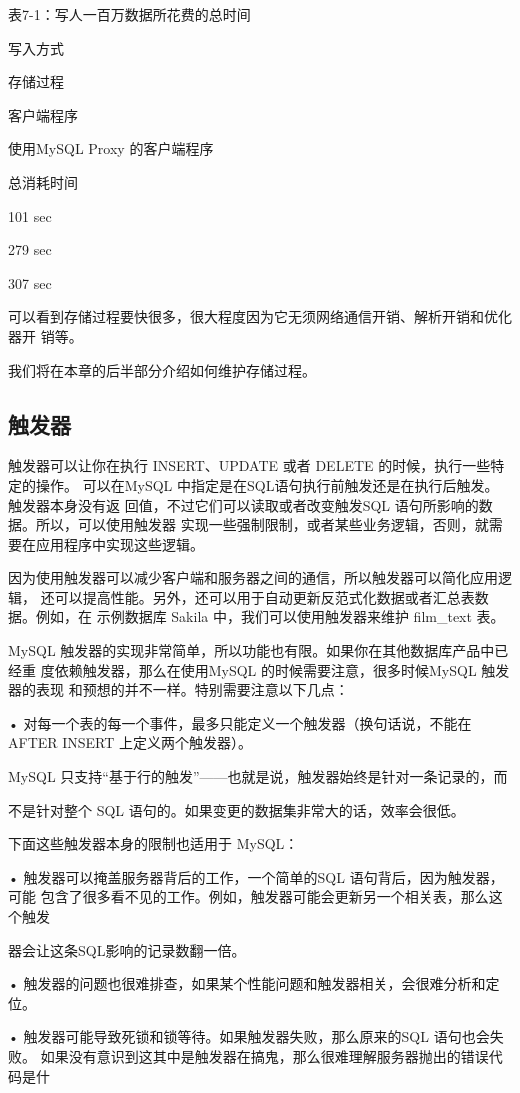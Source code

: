 表7-1：写人一百万数据所花费的总时间

写入方式

存储过程

客户端程序

使用MySQL Proxy 的客户端程序

总消耗时间

101 sec

279 sec

307 sec

可以看到存储过程要快很多，很大程度因为它无须网络通信开销、解析开销和优化器开
销等。

我们将在本章的后半部分介绍如何维护存储过程。

\subsection{触发器}
触发器可以让你在执行 INSERT、UPDATE 或者 DELETE 的时候，执行一些特定的操作。
可以在MySQL 中指定是在SQL语句执行前触发还是在执行后触发。触发器本身没有返
回值，不过它们可以读取或者改变触发SQL 语句所影响的数据。所以，可以使用触发器
实现一些强制限制，或者某些业务逻辑，否则，就需要在应用程序中实现这些逻辑。

因为使用触发器可以减少客户端和服务器之间的通信，所以触发器可以简化应用逻辑，
还可以提高性能。另外，还可以用于自动更新反范式化数据或者汇总表数据。例如，在
示例数据库 Sakila 中，我们可以使用触发器来维护 film\_text 表。

MySQL 触发器的实现非常简单，所以功能也有限。如果你在其他数据库产品中已经重
度依赖触发器，那么在使用MySQL 的时候需要注意，很多时候MySQL 触发器的表现
和预想的并不一样。特别需要注意以下几点：

• 对每一个表的每一个事件，最多只能定义一个触发器（换句话说，不能在AFTER
INSERT 上定义两个触发器）。

MySQL 只支持“基于行的触发”——也就是说，触发器始终是针对一条记录的，而

不是针对整个 SQL 语句的。如果变更的数据集非常大的话，效率会很低。

下面这些触发器本身的限制也适用于 MySQL：

• 触发器可以掩盖服务器背后的工作，一个简单的SQL 语句背后，因为触发器，可能
包含了很多看不见的工作。例如，触发器可能会更新另一个相关表，那么这个触发

器会让这条SQL影响的记录数翻一倍。

• 触发器的问题也很难排查，如果某个性能问题和触发器相关，会很难分析和定位。

• 触发器可能导致死锁和锁等待。如果触发器失败，那么原来的SQL 语句也会失败。
如果没有意识到这其中是触发器在搞鬼，那么很难理解服务器抛出的错误代码是什

